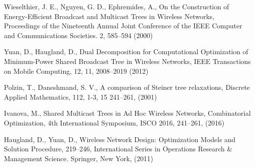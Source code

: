 \begin{thebibliography}{}
%
%
Wieselthier,  J. E., Nguyen, G. D., Ephremides, A.,
On the Construction of Energy-Efficient Broadcast and Multicast Trees in Wireless Networks,
Proceedings of the Nineteenth Annual Joint Conference of the IEEE Computer and Communications Societies.
2, 585--594 (2000)

Yuan, D., Haugland, D.,
Dual Decomposition for Computational Optimization of Minimum-Power Shared Broadcast Tree in Wireless Networks,
IEEE Transactions on Mobile Computing,
12, 11, 2008--2019 (2012)

Polzin, T., Daneshmand, S. V., A comparison of Steiner tree relaxations, Discrete Applied Mathematics, 112,  1-3, 15 241--261, (2001)

Ivanova, M., Shared Multicast Trees in Ad Hoc Wireless Networks, Combinatorial Optimization, 4th International Symposium, ISCO 2016, 241--261, (2016)

Haugland, D., Yuan, D.,
Wireless Network Design: Optimization Models and Solution Procedure, 219--246,
International Series in Operations Research \& Management Science.
Springer, New York, (2011)

\end{thebibliography}



